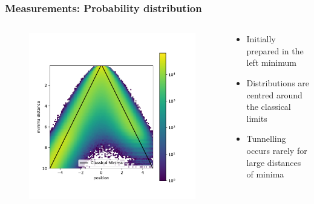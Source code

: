 \documentclass[aspectratio=169]{beamer}
\begin{document}
\begin{frame}
	\frametitle{Measurements: Probability distribution}
	\vspace{-15px}
	\begin{columns}
		\begin{column}{0.55\textwidth}
			\begin{figure}[H]
				\centering
				\includegraphics[width=\textwidth]{../imgs/anharmonic_oscillator_lambda_parameter/track_100001000_lambda_parameter.pdf}
				\label{fig:anharmonic_oscillator_lambda_parameter}
			\end{figure}
		\end{column}
		\begin{column}{0.44\textwidth}
			\begin{itemize}
				\item Initially prepared in the left minimum
				\item Distributions are centred around the classical limits
				\item Tunnelling occurs rarely for large distances of minima
			\end{itemize}
		\end{column}
	\end{columns}
\end{frame}
\end{document}
